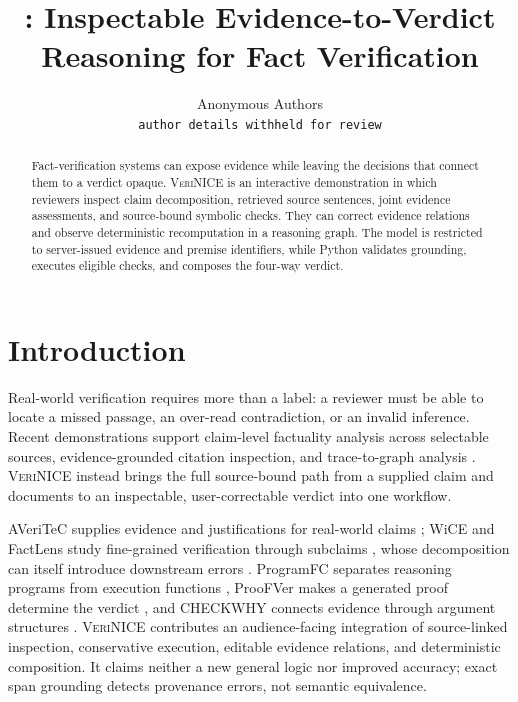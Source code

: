\documentclass[letterpaper,twocolumn,10pt]{article}
\title{\system: Inspectable Evidence-to-Verdict Reasoning for Fact Verification}
\author{Anonymous Authors\\
\texttt{author details withheld for review}}
\date{}
\newcommand{\system}{\textsc{VeriNICE}}
\begin{document}
\maketitle

\begin{abstract}
Fact-verification systems can expose evidence while leaving the decisions that
connect them to a verdict opaque. \system{} is an interactive demonstration in
which reviewers inspect claim decomposition, retrieved source sentences, joint
evidence assessments, and source-bound symbolic checks. They can correct
evidence relations and observe deterministic recomputation in a reasoning graph.
The model is restricted to server-issued evidence and premise identifiers,
while Python validates grounding, executes eligible checks, and composes the
four-way verdict.
\end{abstract}

\section{Introduction}

Real-world verification requires more than a label: a reviewer must be able to
locate a missed passage, an over-read contradiction, or an invalid inference.
Recent demonstrations support claim-level factuality analysis across selectable
sources, evidence-grounded citation inspection, and trace-to-graph analysis
\cite{huang-etal-2026-ufo,lee-etal-2026-reflens,wu-etal-2026-agentgraph}.
\system{} instead brings the full source-bound path from a supplied claim and
documents to an inspectable, user-correctable verdict into one workflow.

AVeriTeC supplies evidence and justifications for real-world claims
\cite{schlichtkrull-etal-2023-averitec}; WiCE and FactLens study fine-grained
verification through subclaims \cite{kamoi-etal-2023-wice,mitra-etal-2025-factlens},
whose decomposition can itself introduce downstream errors
\cite{wanner-etal-2024-closer,hu-etal-2025-decomposition}. ProgramFC separates
reasoning programs from execution functions \cite{pan-etal-2023-fact}, ProoFVer
makes a generated proof determine the verdict \cite{krishna-etal-2022-proofver},
and CHECKWHY connects evidence through argument structures
\cite{si-etal-2024-checkwhy}. \system{} contributes an audience-facing
integration of source-linked inspection, conservative execution, editable
evidence relations, and deterministic composition. It claims neither a new
general logic nor improved accuracy; exact span grounding detects provenance
errors, not semantic equivalence.
\end{document}
